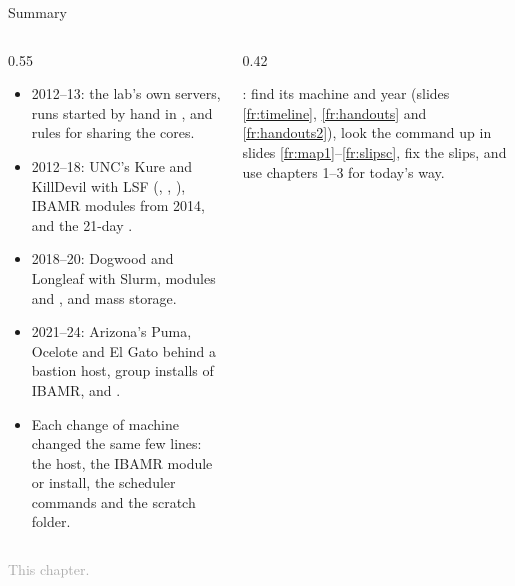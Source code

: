 \documentclass[aspectratio=169,11pt]{beamer}
\newcommand{\sourcecredit}[1]{\vfill\begin{flushright}\tiny\textcolor{DarkGray}{#1}\end{flushright}}
\begin{document}
\begin{frame}{Summary}
\label{fr:summary}
\begin{columns}[T,onlytextwidth]
\begin{column}{0.55\textwidth}
\footnotesize
\begin{itemize}\setlength{\itemsep}{3pt}
  \item 2012--13: the lab's own servers, runs started by hand in , and rules for sharing the cores.
  \item 2012--18: UNC's Kure and KillDevil with LSF (, , ), IBAMR modules from 2014, and the 21-day .
  \item 2018--20: Dogwood and Longleaf with Slurm, modules  and ,  and mass storage.
  \item 2021--24: Arizona's Puma, Ocelote and El Gato behind a bastion host, group installs of IBAMR,  and .
  \item Each change of machine changed the same few lines: the host, the IBAMR module or install, the scheduler commands and the scratch folder.
\end{itemize}
\end{column}
\begin{column}{0.42\textwidth}
\begin{punchbox}
\small {}: find its machine and year (slides \ref{fr:timeline}, \ref{fr:handouts} and \ref{fr:handouts2}), look the command up in slides \ref{fr:map1}--\ref{fr:slipsc}, fix the slips, and use chapters 1--3 for today's way.
\end{punchbox}
\end{column}
\end{columns}
\sourcecredit{This chapter.}
\end{frame}
\end{document}
